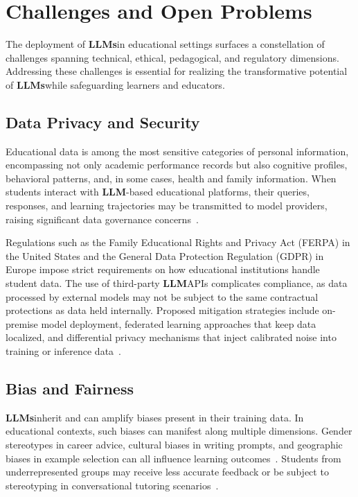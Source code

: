 \documentclass[preprint,12pt]{article}
\newcommand{\LLM}{\textbf{LLM}}
\newcommand{\LLMs}{\textbf{LLMs}}
\theoremstyle{mystyle}
\begin{document}
\section{Challenges and Open Problems}
\label{sec:challenges}

The deployment of \LLMs in educational settings surfaces a constellation of challenges spanning technical, ethical, pedagogical, and regulatory dimensions. Addressing these challenges is essential for realizing the transformative potential of \LLMs while safeguarding learners and educators.

\subsection{Data Privacy and Security}
\label{sec:privacy}

Educational data is among the most sensitive categories of personal information, encompassing not only academic performance records but also cognitive profiles, behavioral patterns, and, in some cases, health and family information. When students interact with \LLM-based educational platforms, their queries, responses, and learning trajectories may be transmitted to model providers, raising significant data governance concerns~\citep{long2024data}.

Regulations such as the Family Educational Rights and Privacy Act (FERPA) in the United States and the General Data Protection Regulation (GDPR) in Europe impose strict requirements on how educational institutions handle student data. The use of third-party \LLM APIs complicates compliance, as data processed by external models may not be subject to the same contractual protections as data held internally. Proposed mitigation strategies include on-premise model deployment, federated learning approaches that keep data localized, and differential privacy mechanisms that inject calibrated noise into training or inference data~\citep{yue2024privacy}.

\subsection{Bias and Fairness}
\label{sec:bias}

\LLMs inherit and can amplify biases present in their training data. In educational contexts, such biases can manifest along multiple dimensions. Gender stereotypes in career advice, cultural biases in writing prompts, and geographic biases in example selection can all influence learning outcomes~\citep{zhao2019bias}. Students from underrepresented groups may receive less accurate feedback or be subject to stereotyping in conversational tutoring scenarios~\citep{kasneci2023chatgpt}.
\end{document}
